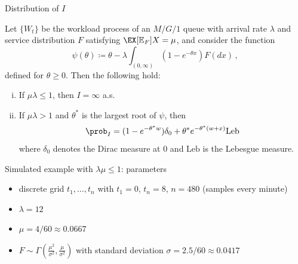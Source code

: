 \documentclass{beamer}
\begin{document}
\begin{frame}{Distribution of $I$}
  \small
  \begin{theorem} \label{thm:pois-idle-time}
    Let $\{ W_t \}$ be the workload process of an $M/G/1$ queue with arrival rate $\lambda$ and service distribution $F$ satisfying $\EX[\mathbb{E}_F]{X} = \mu$, and consider the function
    \begin{equation}
      \psi(\theta) \coloneqq \theta - \lambda \int_{(0, \infty)} \left( 1 - e^{-\theta x} \right) F(dx)  \,,
    \end{equation}
    defined for $\theta \geq 0$. Then the following hold:
    \begin{enumerate}[(i)]
      \item \label{pois_idle_time-i}
      If $\mu \lambda \leq 1$, then $I = \infty$ a.s.
      \item \label{pois_idle_time-ii}
      If $\mu \lambda > 1$ and $\theta^*$ is the largest root of $\psi$, then
      \begin{equation}
        \prob_I = (1 - e^{-\theta^* w}) \delta_0 + \theta^* e^{-\theta^*{(w + x)}} \mathrm{Leb}
      \end{equation}
      where $\delta_0$ denotes the Dirac measure at $0$ and $\mathrm{Leb}$ is the Lebesgue measure.
    \end{enumerate}
  \end{theorem}
\end{frame}

\begin{frame}[plain]{Simulated example with $\lambda \mu \leq 1$: parameters}
  \begin{itemize}
    \item discrete grid $t_1, \dots, t_n$ with $t_1 = 0$, $t_n = 8$, $n = 480$ (samples every minute)
    \item $\lambda = 12$
    \item $\mu = 4 / 60 \approx 0.0667$
    \item $F \sim \Gamma(\frac{\mu^2}{\sigma^2}, \frac{\mu}{\sigma^2})$ with standard deviation $\sigma = 2.5 / 60 \approx 0.0417$ 
  \end{itemize}
\end{frame}
\end{document}
